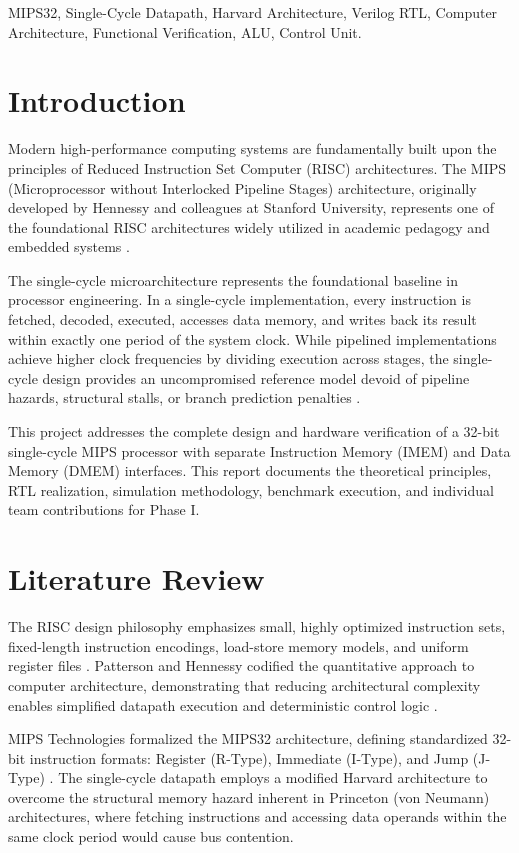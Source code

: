 \documentclass[conference]{IEEEtran}
\begin{document}
\begin{IEEEkeywords}
MIPS32, Single-Cycle Datapath, Harvard Architecture, Verilog RTL, Computer Architecture, Functional Verification, ALU, Control Unit.
\end{IEEEkeywords}

\section{Introduction}
Modern high-performance computing systems are fundamentally built upon the principles of Reduced Instruction Set Computer (RISC) architectures. The MIPS (Microprocessor without Interlocked Pipeline Stages) architecture, originally developed by Hennessy and colleagues at Stanford University, represents one of the foundational RISC architectures widely utilized in academic pedagogy and embedded systems \cite{patterson2020}.

The single-cycle microarchitecture represents the foundational baseline in processor engineering. In a single-cycle implementation, every instruction is fetched, decoded, executed, accesses data memory, and writes back its result within exactly one period of the system clock. While pipelined implementations achieve higher clock frequencies by dividing execution across stages, the single-cycle design provides an uncompromised reference model devoid of pipeline hazards, structural stalls, or branch prediction penalties \cite{harris2021}.

This project addresses the complete design and hardware verification of a 32-bit single-cycle MIPS processor with separate Instruction Memory (IMEM) and Data Memory (DMEM) interfaces. This report documents the theoretical principles, RTL realization, simulation methodology, benchmark execution, and individual team contributions for Phase I.

\section{Literature Review}
The RISC design philosophy emphasizes small, highly optimized instruction sets, fixed-length instruction encodings, load-store memory models, and uniform register files \cite{radin1982}. Patterson and Hennessy codified the quantitative approach to computer architecture, demonstrating that reducing architectural complexity enables simplified datapath execution and deterministic control logic \cite{patterson2020}.

MIPS Technologies formalized the MIPS32 architecture, defining standardized 32-bit instruction formats: Register (R-Type), Immediate (I-Type), and Jump (J-Type) \cite{mips2014}. The single-cycle datapath employs a modified Harvard architecture to overcome the structural memory hazard inherent in Princeton (von Neumann) architectures, where fetching instructions and accessing data operands within the same clock period would cause bus contention. 
\end{document}
